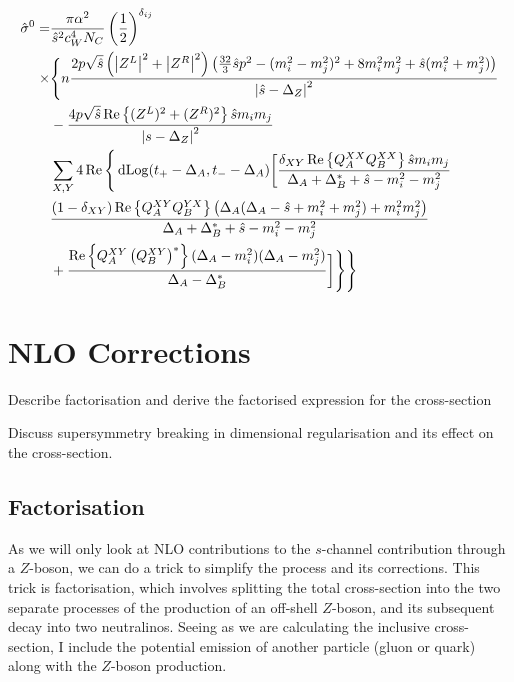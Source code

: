 \documentclass[../main.tex]{subfiles}
\begin{document}
\begin{temporary}
  \begin{align}
    \hat{\sigma}^0 = & \frac{\pi \alpha^2}{\hat{s}^2 c_W^4 N_C} \left(\frac{1}{2}\right)^{\delta_{ij}}                                                                                                                           \\
    \times           & \Bigg\{n\frac{2p\sqrt{\hat{s}} \left(\left|Z^L\right|^2+\left|Z^R\right|^2\right) \left(\frac{32}{3}\hat{s}p^2-(m_i^2-m_j^2)^2+8m_i^2m_j^2+\hat{s}(m_i^2+m_j^2)\right)}{\left|\hat{s} - \Delta_Z\right|^2}                        \\
                     & - \frac{4p\sqrt{\hat{s}}\operatorname{Re}\left\{(Z^L)^2 + (Z^R)^2\right\} \hat{s} m_i m_j}{\left|s-\Delta_Z\right|^2}                                                                                                                    \\
                     & \sum_{X,Y} 4\operatorname{Re}\Bigg\{\operatorname{dLog}(t_+ - \Delta_A, t_- - \Delta_A) \bigg[\frac{\delta_{XY}\operatorname{Re}\left\{Q_A^{XX}Q_B^{XX}\right\}\hat{s}m_im_j}{\Delta_A + \Delta_B^\ast + \hat{s} - m_i^2 - m_j^2} \\
                     & \frac{(1-\delta_{XY})\operatorname{Re}\left\{Q_A^{XY}Q_B^{YX}\right\} \left(\Delta_A(\Delta_A-\hat{s}+m_i^2+m_j^2) + m_i^2m_j^2\right)}{\Delta_A + \Delta_B^\ast + \hat{s} - m_i^2 - m_j^2}                                          \\
                     & + \frac{\operatorname{Re}\left\{Q_A^{XY} \left(Q_B^{XY}\right)^\ast\right\} (\Delta_A - m_i^2)(\Delta_A - m_j^2)}{\Delta_A - \Delta_B^\ast} \bigg] \Bigg\}\Bigg\}
  \end{align}
\end{temporary}

\section{NLO Corrections}
\begin{TODO}
  \item Describe factorisation and derive the factorised expression for
  the cross-section
  \item Discuss supersymmetry breaking in dimensional regularisation and
  its effect on
  the cross-section.
\end{TODO}

\subsection{Factorisation}
As we will only look at NLO contributions to the \(s\)-channel contribution through a \(Z\)-boson, we can do a trick to simplify the process and its corrections.
This trick is factorisation, which involves splitting the total cross-section into the two separate processes of the production of an off-shell \(Z\)-boson, and its subsequent decay into two neutralinos.
Seeing as we are calculating the inclusive cross-section, I include the potential emission of another particle (gluon or quark) along with the \(Z\)-boson production.
\end{document}
